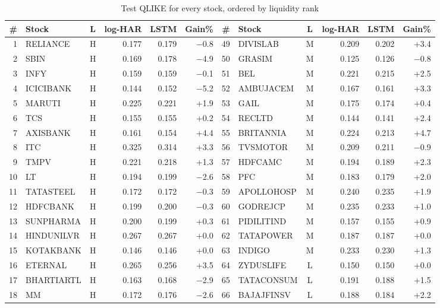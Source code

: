 \begin{table}[H]
\centering
\caption{Test QLIKE for every stock, ordered by liquidity rank}
\label{tab:perstock}
\scriptsize
\begin{adjustbox}{max width=\textwidth}
\begin{tabular}{rlcrrr|rlcrrr}
\toprule
\# & Stock & L & log-HAR & LSTM & Gain\% & \# & Stock & L & log-HAR & LSTM & Gain\% \\
\midrule
1 & RELIANCE & H & 0.177 & 0.179 & $-$0.8 & 49 & DIVISLAB & M & 0.209 & 0.202 & +3.4 \\
2 & SBIN & H & 0.169 & 0.178 & $-$4.9 & 50 & GRASIM & M & 0.125 & 0.126 & $-$0.8 \\
3 & INFY & H & 0.159 & 0.159 & $-$0.1 & 51 & BEL & M & 0.221 & 0.215 & +2.5 \\
4 & ICICIBANK & H & 0.144 & 0.152 & $-$5.2 & 52 & AMBUJACEM & M & 0.167 & 0.161 & +3.3 \\
5 & MARUTI & H & 0.225 & 0.221 & +1.9 & 53 & GAIL & M & 0.175 & 0.174 & +0.4 \\
6 & TCS & H & 0.155 & 0.155 & +0.2 & 54 & RECLTD & M & 0.144 & 0.141 & +2.4 \\
7 & AXISBANK & H & 0.161 & 0.154 & +4.4 & 55 & BRITANNIA & M & 0.224 & 0.213 & +4.7 \\
8 & ITC & H & 0.325 & 0.314 & +3.3 & 56 & TVSMOTOR & M & 0.209 & 0.211 & $-$0.9 \\
9 & TMPV & H & 0.221 & 0.218 & +1.3 & 57 & HDFCAMC & M & 0.194 & 0.189 & +2.3 \\
10 & LT & H & 0.194 & 0.199 & $-$2.6 & 58 & PFC & M & 0.183 & 0.179 & +2.0 \\
11 & TATASTEEL & H & 0.172 & 0.172 & $-$0.3 & 59 & APOLLOHOSP & M & 0.240 & 0.235 & +1.9 \\
12 & HDFCBANK & H & 0.199 & 0.200 & $-$0.3 & 60 & GODREJCP & M & 0.235 & 0.233 & +1.0 \\
13 & SUNPHARMA & H & 0.200 & 0.199 & +0.3 & 61 & PIDILITIND & M & 0.157 & 0.155 & +0.9 \\
14 & HINDUNILVR & H & 0.267 & 0.267 & +0.0 & 62 & TATAPOWER & M & 0.187 & 0.187 & +0.0 \\
15 & KOTAKBANK & H & 0.146 & 0.146 & +0.0 & 63 & INDIGO & M & 0.233 & 0.230 & +1.3 \\
16 & ETERNAL & H & 0.265 & 0.256 & +3.5 & 64 & ZYDUSLIFE & L & 0.150 & 0.150 & +0.0 \\
17 & BHARTIARTL & H & 0.163 & 0.168 & $-$2.9 & 65 & TATACONSUM & L & 0.191 & 0.188 & +1.5 \\
18 & MM & H & 0.172 & 0.176 & $-$2.6 & 66 & BAJAJFINSV & L & 0.188 & 0.184 & +2.2 \\

\end{tabular}
\end{adjustbox}
\end{table}
